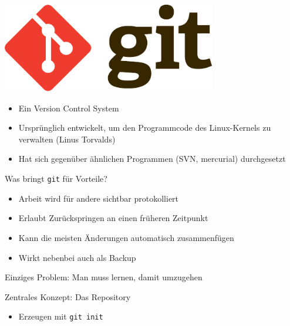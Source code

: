 \begin{frame}
    \centering
    \includegraphics[width=0.7\textwidth]{logos/git.pdf}
    
    \vspace{1em}

    \begin{itemize}
      \item Ein Version Control System
      \item Ursprünglich entwickelt, um den Programmcode des Linux-Kernels zu verwalten (Linus Torvalds)
      \item Hat sich gegenüber ähnlichen Programmen (SVN, mercurial) durchgesetzt
    \end{itemize}
\end{frame}

\begin{frame}{Was bringt \texttt{git} für Vorteile?}
  \begin{itemize}
    \item Arbeit wird für andere sichtbar protokolliert
    \item Erlaubt Zurückspringen an einen früheren Zeitpunkt
    \item Kann die meisten Änderungen automatisch zusammenfügen
    \item Wirkt nebenbei auch als Backup
  \end{itemize}
  Einziges Problem: Man muss lernen, damit umzugehen
\end{frame}

\begin{frame}{Zentrales Konzept: Das Repository}
  \begin{itemize}
    \item Erzeugen mit \texttt{git init}
  \end{itemize}
  \vspace{3em}
  \centering
\end{frame}

